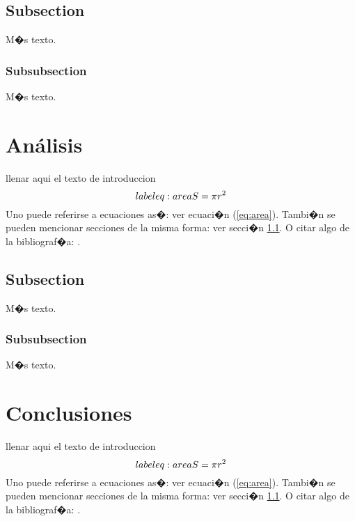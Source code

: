\documentclass{article}
\theoremstyle{definition}
\theoremstyle{remark}
\begin{document}
\subsection{Subsection}\label{sec:nada}

M�s texto.

\subsubsection{Subsubsection}\label{sec:nada2}

M�s texto.




\section{An\'alisis}

llenar aqui el texto de introduccion
\begin{equation}\\label{eq:area}
  S = \pi r^2
\end{equation}
Uno puede referirse a ecuaciones as�: ver ecuaci�n (\ref{eq:area}).
Tambi�n se pueden mencionar secciones de la misma forma: ver secci�n
\ref{sec:nada}. O citar algo de la bibliograf�a: \cite{Cd94}.

\subsection{Subsection}\label{sec:nada}

M�s texto.

\subsubsection{Subsubsection}\label{sec:nada2}

M�s texto.






\section{Conclusiones}

llenar aqui el texto de introduccion
\begin{equation}\\label{eq:area}
  S = \pi r^2
\end{equation}
Uno puede referirse a ecuaciones as�: ver ecuaci�n (\ref{eq:area}).
Tambi�n se pueden mencionar secciones de la misma forma: ver secci�n
\ref{sec:nada}. O citar algo de la bibliograf�a: \cite{Cd94}.
\end{document}
